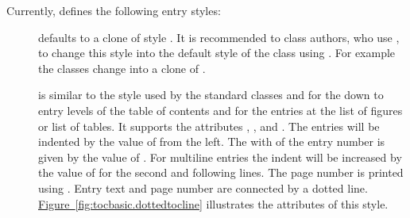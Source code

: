 Currently,  defines the following entry styles:
\begin{description}
\item[] defaults to a clone of style
  . It is recommended to class authors, who use
  , to change this style into the default style of the class
  using . For example the \KOMAScript{} classes change
   into a clone of .
\item[] is similar to the style used by the standard
  classes  and  for the  down to
   entry levels of the table of contents and for the
  entries at the list of figures or list of tables. It supports the attributes
  , , and . The entries will be
  indented by the value of  from the left. The with of the
  entry number is given by the value of . For multiline
  entries the indent will be increased by the value of  for
  the second and following lines. The page number is printed using
  . Entry text and page number are
  connected by a dotted line. \hyperref[fig:tocbasic.dottedtocline]%
  {Figure~\ref*{fig:tocbasic.dottedtocline}} illustrates the attributes of
  this style.
  \begin{figure}
    \centering
\end{figure}
\end{description}
